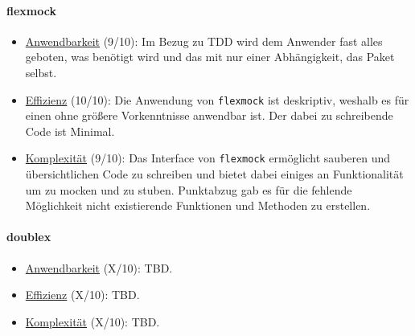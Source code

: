 \paragraph{flexmock}\label{zusammenfassung:mock:flexmock}\mbox{}
\newline
\begin{itemize}
    \item \underline{Anwendbarkeit} (9/10):\newline
    Im Bezug zu TDD wird dem Anwender fast alles geboten, was benötigt wird und
    das mit nur einer Abhängigkeit, das Paket selbst.
    
    \item \underline{Effizienz} (10/10):\newline
    Die Anwendung von \lstinline{flexmock} ist deskriptiv, weshalb es für einen
    ohne größere Vorkenntnisse anwendbar ist. Der dabei zu schreibende Code ist
    Minimal.
    
    \item \underline{Komplexität} (9/10):\newline
    Das Interface von \lstinline{flexmock} ermöglicht sauberen und
    übersichtlichen Code zu schreiben und bietet dabei einiges an Funktionalität
    um zu \gls{mock}en und zu \gls{stub}en. Punktabzug gab es für die fehlende
    Möglichkeit nicht existierende Funktionen und Methoden zu erstellen.
\end{itemize}

\paragraph{doublex}\label{zusammenfassung:mock:doublex}\mbox{}
\newline
\begin{itemize}
    \item \underline{Anwendbarkeit} (X/10):\newline
    TBD.
    
    \item \underline{Effizienz} (X/10):\newline
    TBD.
    
    \item \underline{Komplexität} (X/10):\newline
    TBD.
\end{itemize}

